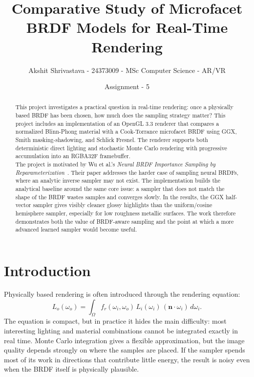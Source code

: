 \documentclass[12pt]{article}
\title{\textbf{Comparative Study of Microfacet BRDF Models for Real-Time Rendering}}
\date{Assignment - 5}
\author{Akshit Shrivastava - 24373009 - MSc Computer Science - AR/VR}
\begin{document}
\maketitle
\tableofcontents
\newpage
\begin{abstract}
\noindent This project investigates a practical question in real-time rendering: once a physically based BRDF has been chosen, how much does the sampling strategy matter? This project includes an implementation of an OpenGL 3.3 renderer that compares a normalized Blinn-Phong material with a Cook-Torrance microfacet BRDF using GGX, Smith masking-shadowing, and Schlick Fresnel. The renderer supports both deterministic direct lighting and stochastic Monte Carlo rendering with progressive accumulation into an RGBA32F framebuffer.\\

\noindent The project is motivated by Wu et al.'s \emph{Neural BRDF Importance Sampling by Reparameterization}~\cite{wu2025neural}. Their paper addresses the harder case of sampling neural BRDFs, where an analytic inverse sampler may not exist. The implementation builds the analytical baseline around the same core issue: a sampler that does not match the shape of the BRDF wastes samples and converges slowly. In the results, the GGX half-vector sampler gives visibly cleaner glossy highlights than the uniform/cosine hemisphere sampler, especially for low roughness metallic surfaces. The work therefore demonstrates both the value of BRDF-aware sampling and the point at which a more advanced learned sampler would become useful.
\end{abstract}

\section{Introduction}

Physically based rendering is often introduced through the rendering equation:
\begin{equation}
L_o(\omega_o) =
\int_{\Omega}
f_r(\omega_i,\omega_o)\,L_i(\omega_i)\,
(\mathbf{n}\cdot\omega_i)\,d\omega_i .
\end{equation}
The equation is compact, but in practice it hides the main difficulty: most interesting lighting and material combinations cannot be integrated exactly in real time. Monte Carlo integration gives a flexible approximation, but the image quality depends strongly on where the samples are placed. If the sampler spends most of its work in directions that contribute little energy, the result is noisy even when the BRDF itself is physically plausible.
\end{document}
